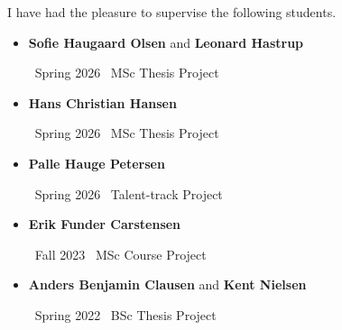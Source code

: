 
I have had the pleasure to supervise the following students.

\medskip

\begin{itemize}

\item {\color{accent} \textbf{Sofie Haugaard Olsen} and \textbf{Leonard Hastrup}}

  \smallskip

  \faCalendar\ Spring 2026 \hspace{90pt} \faGraduationCap\ MSc Thesis Project

%

\item {\color{accent} \textbf{Hans Christian Hansen}}

  \smallskip

  \faCalendar\ Spring 2026 \hspace{90pt} \faGraduationCap\ MSc Thesis Project

%

\item {\color{accent} \textbf{Palle Hauge Petersen}}

  \smallskip

  \faCalendar\ Spring 2026 \hspace{90pt} \faGraduationCap\ Talent-track Project

%

\item {\color{accent} \textbf{Erik Funder Carstensen}}

  \smallskip

  \faCalendar\ Fall 2023 \hspace{102pt} \faGraduationCap\ MSc Course Project

%

  \medskip

\item {\color{accent} \textbf{Anders Benjamin Clausen} and \textbf{Kent Nielsen}}

  \smallskip

  \faCalendar\ Spring 2022 \hspace{90pt} \faGraduationCap\ BSc Thesis Project


\end{itemize}
